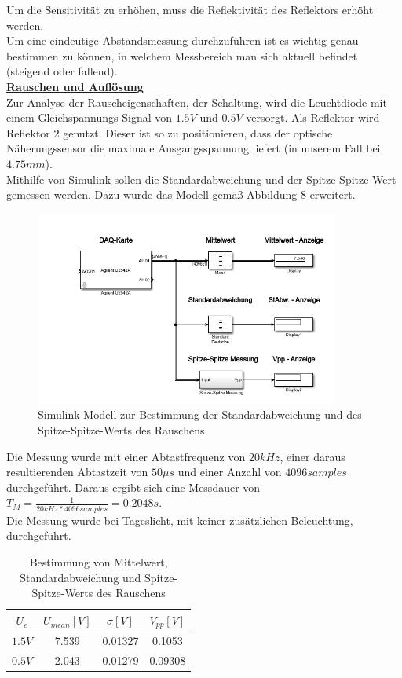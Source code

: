 \documentclass[a4paper,12pt]{article}
\begin{document}
	Um die Sensitivität zu erhöhen, muss die Reflektivität des Reflektors erhöht werden.\\ \newline
	Um eine eindeutige Abstandsmessung durchzuführen ist es wichtig genau bestimmen zu können, in welchem Messbereich man sich aktuell befindet (steigend oder fallend).\\ \newline
	\noindent
	\underline{\textbf{Rauschen und Auflösung}} \\ \newline
	Zur Analyse der Rauscheigenschaften, der Schaltung, wird die Leuchtdiode mit einem Gleichspannungs-Signal von $1.5V$ und $0.5V$ versorgt. Als Reflektor wird Reflektor 2 genutzt. Dieser ist so zu positionieren, dass der optische Näherungssensor die maximale Ausgangsspannung liefert (in unserem Fall bei $4.75mm$).\\ \newline
	Mithilfe von Simulink sollen die Standardabweichung und der Spitze-Spitze-Wert gemessen werden. Dazu wurde das Modell gemäß Abbildung 8 erweitert.
	\begin{figure}[h]
		\centering
		\includegraphics[width=10cm]{assets/rauschen_aufbau}
		\caption{Simulink Modell zur Bestimmung der Standardabweichung und des Spitze-Spitze-Werts des Rauschens}
	\end{figure}
	\newpage
	\noindent
	Die Messung wurde mit einer Abtastfrequenz von $20kHz$, einer daraus resultierenden Abtastzeit von $50\mu s$ und einer Anzahl von $4096 samples$ durchgeführt. Daraus ergibt sich eine Messdauer von \(T_M=\frac{1}{20kHz*4096 samples}=0.2048s\).\\ \newline
	Die Messung wurde bei Tageslicht, mit keiner zusätzlichen Beleuchtung, durchgeführt.\newline
	\begin{table}[h]
		\centering
		\begin{tabular}{|c|c|c|c|}
			\hline
			\textit{$U_e$} & \textit{$U_{mean}[V]$} & \textit{$\sigma[V]$} & \textit{$V_{pp}[V]$} \\ \hline
			$1.5V$ & 7.539 & 0.01327 & 0.1053 \\ \hline
			$0.5V$ & 2.043 & 0.01279 & 0.09308 \\ \hline
		\end{tabular}
		\caption{Bestimmung von Mittelwert, Standardabweichung und Spitze-Spitze-Werts des Rauschens}
		\label{tab:my-table}
	\end{table}\newline
\end{document}
